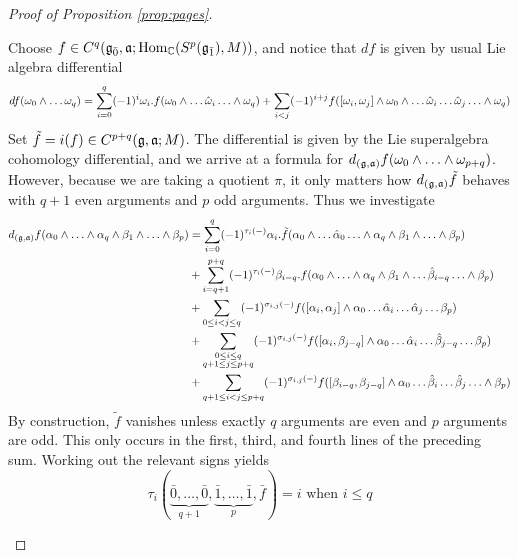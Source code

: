 \begin{proof}[Proof of Proposition \ref{prop:pages}]
\begin{enumerate}[(a)]
  Choose $f \in C^q({\mathfrak{g}}_{\bar{0}},\mathfrak{a};\operatorname{Hom}_{\mathbb{C}}(S^p({\mathfrak{g}}_{\bar{1}}),M))$, and notice that $df$ is given by usual Lie algebra differential
  \[
df(\omega_0 \wedge \ldots \omega_q) = \sum_{i = 0}^q (-1)^i \omega_i.f(\omega_0 \wedge \ldots \hat {\omega}_i \ldots \wedge \omega_q) + \sum_{i < j} (-1)^{i+j}f([\omega_i,\omega_j] \wedge \omega_0 \wedge \ldots \hat {\omega}_i \ldots \hat {\omega}_j \ldots \wedge \omega_q)
  \]
  Set $\tilde f = i(f) \in C^{p+q}(\mathfrak{g},\mathfrak{a};M)$. The differential is given by the Lie superalgebra cohomology differential, and we arrive at a formula for $d_{(\mathfrak{g},\mathfrak{a})}f(\omega_0 \wedge \ldots \wedge \omega_{p+q})$. However, because we are taking a quotient $\pi$, it only matters how $d_{(\mathfrak{g},\mathfrak{a})}\tilde{f}$ behaves with $q+1$ even arguments and $p$ odd arguments. Thus we investigate
  \begin{align*}
    d_{(\mathfrak{g},\mathfrak{a})}f(\alpha_0\wedge \ldots \wedge \alpha_q \wedge \beta_1 \wedge \ldots \wedge \beta_p) &= \sum_{i = 0}^q (-1)^{\tau_i(-)} \alpha_i.\tilde{f}(\alpha_0\wedge \ldots \hat \alpha_0 \ldots \wedge \alpha_q \wedge \beta_1 \wedge \ldots \wedge \beta_p) \\
                                                                                                    &+ \sum_{i = q+1}^{p+q} (-1)^{\tau_i(-)} \beta_{i - q}.f(\alpha_0 \wedge \ldots \wedge \alpha_q \wedge \beta_1 \wedge \ldots \hat \beta_{i-q} \ldots \wedge \beta_p) \\
                                                                                                    &+ \sum_{0 \leq i < j \leq q} (-1)^{\sigma_{i,j}(-)}f([\alpha_i,\alpha_j] \wedge \alpha_0 \ldots \hat \alpha_i \ldots \hat \alpha_j \ldots \beta_p) \\
                                                                                                    &+ \sum_{\substack{0 \leq i \leq q \\ q+1 \leq j \leq p+q}} (-1)^{\sigma_{i,j}(-)} f([\alpha_i,\beta_{j-q}] \wedge \alpha_0 \ldots \hat \alpha_i \ldots \hat \beta_{j-q} \ldots \beta_p) \\
    &+ \sum_{q+1 \leq i < j \leq p+q} (-1)^{\sigma_{i,j}(-)} f([\beta_{i-q},\beta_{j-q}]\wedge \alpha_0 \ldots \hat \beta_i \ldots \hat \beta_j \ldots \wedge \beta_p)
  \end{align*}
  By construction, $\tilde{f}$ vanishes unless exactly $q$ arguments are even and $p$ arguments are odd. This only occurs in the first, third, and fourth lines of the preceding sum. Working out the relevant signs yields
\[
  \tau_i(\underbrace{\bar 0,\ldots,\bar 0}_{q+1},\underbrace{\bar 1,\ldots,\bar 1}_p,\bar f) = i \text{ when } i \leq q
\]
\end{enumerate}
\end{proof}
